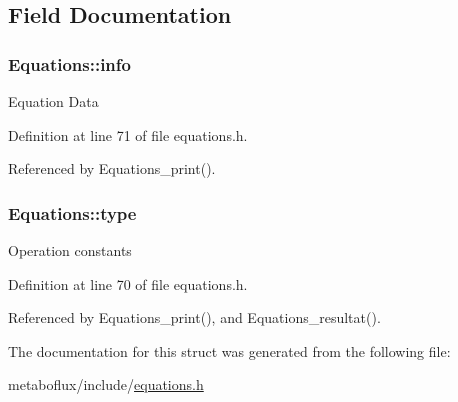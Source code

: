 \subsection{Field Documentation}
\hypertarget{structEquations_a144a9d4f5c2af07da3ecdebbeb419d66}{
\subsubsection[{info}]{ {\bf Equations::info}}}
\label{structEquations_a144a9d4f5c2af07da3ecdebbeb419d66}
Equation Data 

Definition at line 71 of file equations.h.



Referenced by Equations\_\-print().

\hypertarget{structEquations_add825d3104abf54c01421c67536d0991}{
\subsubsection[{type}]{ {\bf Equations::type}}}
\label{structEquations_add825d3104abf54c01421c67536d0991}
Operation constants 

Definition at line 70 of file equations.h.



Referenced by Equations\_\-print(), and Equations\_\-resultat().



The documentation for this struct was generated from the following file:\begin{DoxyCompactItemize}
\item 
metaboflux/include/\hyperlink{equations_8h}{equations.h}\end{DoxyCompactItemize}
